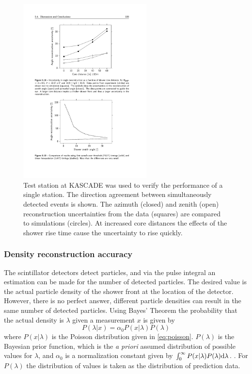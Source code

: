 \begin{figure}
    \centering
    \includegraphics[width=0.6\textwidth]
                    {plots/station/angle_kascade_core_distance}
    \caption{Test station at KASCADE was used to verify the performance of a single station. The direction agreement between simultaneously detected events is shown. The azimuth (closed) and zenith (open) reconstruction uncertainties from the data (squares) are compared to simulations (circles). At increased core distances the effects of the shower rise time cause the uncertainty to rise quickly.}
    \label{fig:angle_kascade_core_distance}
\end{figure}


\subsubsection{Density reconstruction accuracy}

The \hisparc scintillator detectors detect particles, and via the pulse integral an estimation can be made for the number of detected particles. The desired value is the actual particle density of the shower front at the location of the detector. However, there is no perfect answer, different particle densities can result in the same number of detected particles. Using Bayes' Theorem the probability that the actual density is $\lambda$ given a measurement $x$ is given by
%
\begin{equation}
    P(\lambda|x) = \alpha_0 P(x|\lambda) P(\lambda)
\end{equation}
%
where $P(x|\lambda)$ is the Poisson distribution given in \ref{eq:poisson}. $P(\lambda)$ is the Bayesian prior function, which is the \emph{a priori} assumed distribution of possible values for $\lambda$, and $\alpha_0$ is a normalization constant given by $\int_0^\infty P(x|\lambda) P(\lambda) \mathrm{d} \lambda$. \cite{vulpen2011poisson}. For $P(\lambda)$ the distribution of values is taken as the distribution of \kascade prediction data.

